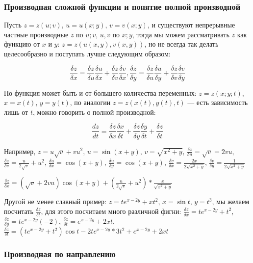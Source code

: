 \documentclass{article}
\begin{document}
\begin{flushleft}
\subsubsection{Производная сложной функции и понятие полной производной}

Пусть $z = z(u; v)$, $u = u(x; y)$, $v = v(x; y)$, и существуют непрерывные частные производные $z$ по $u; v$, $u, v$ по $x; y$, тогда мы можем рассматривать $z$ как функцию от $x$ и $y$: $z = z(u(x, y), v(x, y))$, но не всегда так делать целесообразно и поступать лучше следующим образом:

$$\frac{\delta z}{\delta x} = \frac{\delta z}{\delta u} \frac{\delta u}{\delta x} + \frac{\delta z}{\delta v} \frac{\delta v}{\delta x}, \frac{\delta z}{\delta y} = \frac{\delta z}{\delta u} \frac{\delta u}{\delta y} + \frac{\delta z}{\delta v} \frac{\delta v}{\delta y}$$

Но функция может быть и от большего количества переменных: $z = z(x; y; t)$, $x = x(t)$, $y = y(t)$, по аналогии $z = z(x(t), y(t), t)$ — есть зависимость лишь от $t$, можно говорить о полной производной:

$$
\frac{d z}{d t} = \frac{\delta z}{\delta x} \frac{\delta x}{\delta t} + \frac{\delta z}{\delta y} \frac{\delta y}{\delta t} + \frac{\delta z}{\delta t}
$$

Например, $z = u\sqrt{v} + v u^2$, $u = \sin(x + y)$, $v = \sqrt{x^2 + y}$, $\frac{\delta z}{\delta u} = \sqrt{v} = 2v u$, $\frac{\delta z}{\delta v} = \frac{u}{2 \sqrt{v}} + u^2$, $\frac{\delta u}{\delta x} = \cos (x + y)$, $\frac{\delta u}{\delta y} = \cos (x + y)$, $\frac{\delta v}{\delta x} = \frac{2x}{2\sqrt{x^2 + y}}$, $\frac{\delta v}{\delta y} = \frac{1}{2\sqrt{x^2 + y}}$

$\frac{\delta z}{\delta x} = (\sqrt{v} + 2 v u) \cos (x + y) + (\frac{u}{2\sqrt{v}} + u^2) * \frac{x}{\sqrt{x^2 + y}}$

\hfill

Другой не менее славный пример: $z = t e^{x - 2y} + x t^2$, $x = \sin t$, $y = t^3$, мы желаем посчитать $\frac{\delta z}{\delta t}$, для этого посчитаем много различной фигни: $\frac{\delta z}{\delta x} = t e^{x - 2y} + t^2$, $\frac{\delta z}{\delta y} = t e^{x - 2y} (-2)$, $\frac{\delta z}{\delta t} = e^{x - 2y} + 2 x t$, $\frac{\delta z}{\delta t} = (t e^{x - 2y} + t^2) \cos t - 2 t e^{x - 2 y} * 3t^2 + e^{x -2 y} + 2 xt$

\subsubsection{Производная по направлению}


\end{flushleft}
\end{document}

